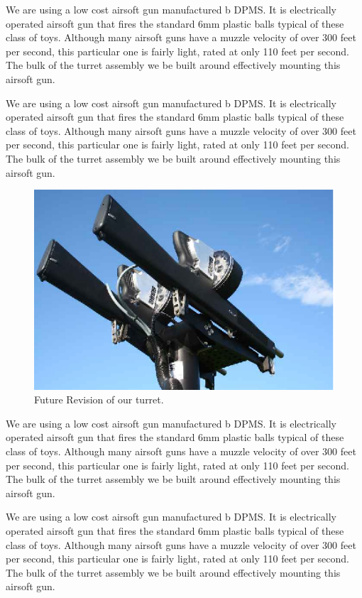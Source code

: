 \documentclass[10pt,twocolumn,letterpaper]{article}
\begin{document}
We are using a low cost airsoft gun manufactured b DPMS. It is electrically operated airsoft gun that fires the standard 6mm plastic balls typical of these class of toys. Although many airsoft guns have a muzzle velocity of over 300 feet per second, this particular one is fairly light, rated at only 110 feet per second. The bulk of the turret assembly we be built around effectively mounting this airsoft gun.

We are using a low cost airsoft gun manufactured b DPMS. It is electrically operated airsoft gun that fires the standard 6mm plastic balls typical of these class of toys. Although many airsoft guns have a muzzle velocity of over 300 feet per second, this particular one is fairly light, rated at only 110 feet per second. The bulk of the turret assembly we be built around effectively mounting this airsoft gun.


\begin{figure}[t]
\begin{center}
  \includegraphics[width=0.8\linewidth]{hammer_069_a.eps}
\end{center}
   \caption{Future Revision of our turret.}
\label{fig:long}
\label{fig:onecol}
\end{figure}
We are using a low cost airsoft gun manufactured b DPMS. It is electrically operated airsoft gun that fires the standard 6mm plastic balls typical of these class of toys. Although many airsoft guns have a muzzle velocity of over 300 feet per second, this particular one is fairly light, rated at only 110 feet per second. The bulk of the turret assembly we be built around effectively mounting this airsoft gun.

We are using a low cost airsoft gun manufactured b DPMS. It is electrically operated airsoft gun that fires the standard 6mm plastic balls typical of these class of toys. Although many airsoft guns have a muzzle velocity of over 300 feet per second, this particular one is fairly light, rated at only 110 feet per second. The bulk of the turret assembly we be built around effectively mounting this airsoft gun.
\end{document}
